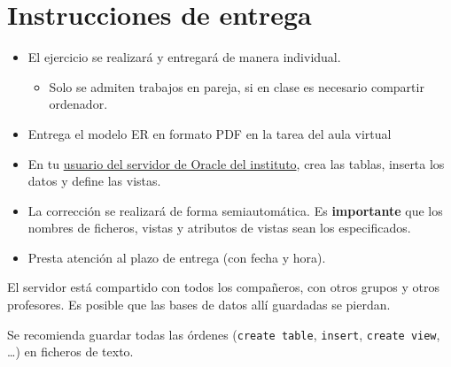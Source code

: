 \documentclass[a4paper]{article}
\begin{document}
\section{Instrucciones de entrega}
\label{sec:org0000012}
\begin{itemize}
\item El ejercicio se realizará y entregará de manera individual.
\begin{itemize}
\item Solo se admiten trabajos en pareja, si en clase es necesario compartir ordenador.
\end{itemize}
\item Entrega el modelo ER en formato PDF en la tarea del aula virtual
\item En tu \href{https://aulavirtual3.educa.madrid.org/ies.alonsodeavellan.alcala/mod/assign/view.php?id=29534}{usuario del servidor de Oracle del instituto}, crea las tablas, inserta los datos y define las vistas.
\item La corrección se realizará de forma semiautomática. Es \textbf{importante} que los nombres de ficheros, vistas y atributos de vistas sean los especificados.
\item Presta atención al plazo de entrega (con fecha y hora).
\end{itemize}


\begin{Aviso}
El servidor está compartido con todos los compañeros, con otros grupos y otros profesores. Es posible que las bases de datos allí guardadas se pierdan.

Se recomienda guardar todas las órdenes (\texttt{create table}, \texttt{insert}, \texttt{create view}, \ldots) en ficheros de texto.
\end{Aviso}
\end{document}
